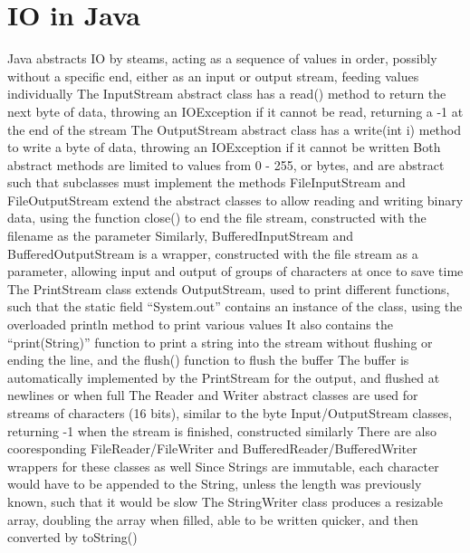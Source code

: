 \documentclass[11 pt, twoside]{article}
\newenvironment{outline*}
{
	\begin{outline}[enumerate]
	}
	{\end{outline}
}
\begin{document}
\section{IO in Java}
\begin{outline*}
\1 Java abstracts IO by steams, acting as a sequence of values in order, possibly without a specific end, either as an input or output stream, feeding values individually
	\2 The InputStream abstract class has a read() method to return the next byte of data, throwing an IOException if it cannot be read, returning a -1 at the end of the stream
	\2 The OutputStream abstract class has a write(int i) method to write a byte of data, throwing an IOException if it cannot be written
	\2 Both abstract methods are limited to values from 0 - 255, or bytes, and are abstract such that subclasses must implement the methods
\1 FileInputStream and FileOutputStream extend the abstract classes to allow reading and writing binary data, using the function close() to end the file stream, constructed with the filename as the parameter
	\2 Similarly, BufferedInputStream and BufferedOutputStream is a wrapper, constructed with the file stream as a parameter, allowing input and output of groups of characters at once to save time
\1 The PrintStream class extends OutputStream, used to print different functions, such that the static field ``System.out'' contains an instance of the class, using the overloaded println method to print various values
	\2 It also contains the ``print(String)'' function to print a string into the stream without flushing or ending the line, and the flush() function to flush the buffer
	\2 The buffer is automatically implemented by the PrintStream for the output, and flushed at newlines or when full
\1 The Reader and Writer abstract classes are used for streams of characters (16 bits), similar to the byte Input/OutputStream classes, returning -1 when the stream is finished, constructed similarly
	\2 There are also cooresponding FileReader/FileWriter and BufferedReader/BufferedWriter wrappers for these classes as well
	\2 Since Strings are immutable, each character would have to be appended to the String, unless the length was previously known, such that it would be slow
		\3 The StringWriter class produces a resizable array, doubling the array when filled, able to be written quicker, and then converted by toString()
\end{outline*}
\end{document}
